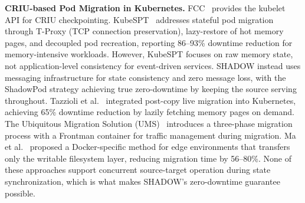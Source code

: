 \documentclass[conference]{IEEEtran}
\begin{document}
\textbf{CRIU-based Pod Migration in Kubernetes.}
FCC~\cite{k8sfcc} provides the kubelet API for CRIU checkpointing.
KubeSPT~\cite{kubespt2025} addresses stateful pod migration through T-Proxy
(TCP connection preservation), lazy-restore of hot memory pages, and decoupled
pod recreation, reporting 86--93\% downtime reduction for memory-intensive
workloads. However, KubeSPT focuses on raw memory state, not application-level
consistency for event-driven services. SHADOW instead uses messaging
infrastructure for state consistency and zero message loss, with the ShadowPod
strategy achieving true zero-downtime by keeping the source serving throughout.
Tazzioli et al.~\cite{tazzioli2023postcopy} integrated post-copy live migration
into Kubernetes, achieving 65\% downtime reduction by lazily fetching memory
pages on demand. The Ubiquitous Migration Solution (UMS)~\cite{ums} introduces
a three-phase migration process with a Frontman container for traffic management
during migration. Ma et al.~\cite{ma2019live} proposed a Docker-specific method
for edge environments that transfers only the writable filesystem layer,
reducing migration time by 56--80\%. None of these approaches support concurrent
source-target operation during state synchronization, which is what makes
SHADOW's zero-downtime guarantee possible.
\end{document}
